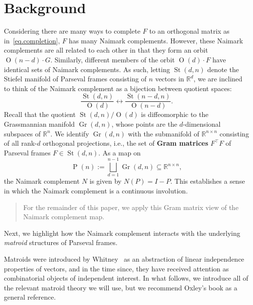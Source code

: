 \documentclass[12pt]{article}
\theoremstyle{plain}
\theoremstyle{definition}
\theoremstyle{remark}
\begin{document}
\section{Background}

Considering there are many ways to complete $F$ to an orthogonal matrix as in~\eqref{eq.completion}, $F$ has many Naimark complements.
However, these Naimark complements are all related to each other in that they form an orbit $\operatorname{O}(n-d)\cdot G$.
Similarly, different members of the orbit $\operatorname{O}(d)\cdot F$ have identical sets of Naimark complements.
As such, letting $\operatorname{St}(d,n)$ denote the Stiefel manifold of Parseval frames consisting of $n$ vectors in $\mathbb{R}^d$, we are inclined to think of the Naimark complement as a bijection between quotient spaces:
\[
\frac{\operatorname{St}(d,n)}{\operatorname{O}(d)}
\longleftrightarrow
\frac{\operatorname{St}(n-d,n)}{\operatorname{O}(n-d)}.
\]
Recall that the quotient $\operatorname{St}(d,n)/\operatorname{O}(d)$ is diffeomorphic to the Grassmannian manifold $\operatorname{Gr}(d,n)$, whose points are the $d$-dimensional subspaces of $\mathbb{R}^n$.
We identify $\operatorname{Gr}(d,n)$ with the submanifold of $\mathbb{R}^{n\times n}$ consisting of all rank-$d$ orthogonal projections, i.e., the set of \textbf{Gram matrices} $F^\top F$ of Parseval frames $F\in\operatorname{St}(d,n)$.
As a map on
\[
\operatorname{P}(n)
:=\bigsqcup_{d=1}^{n-1}\operatorname{Gr}(d,n)
\subseteq\mathbb{R}^{n\times n},
\]
the Naimark complement $N$ is given by $N(P)=I-P$.
This establishes a sense in which the Naimark complement is a continuous involution.
\begin{quote}
For the remainder of this paper, we apply this Gram matrix view of the Naimark complement map.
\end{quote}
Next, we highlight how the Naimark complement interacts with the underlying \textit{matroid} structures of Parseval frames.

Matroids were introduced by Whitney~\cite{Whi35} as an abstraction of linear independence properties of vectors, and in the time since, they have received attention as combinatorial objects of independent interest.
In what follows, we introduce all of the relevant matroid theory we will use, but we recommend Oxley's book \cite{oxley2011matroid} as a general reference.
\end{document}
